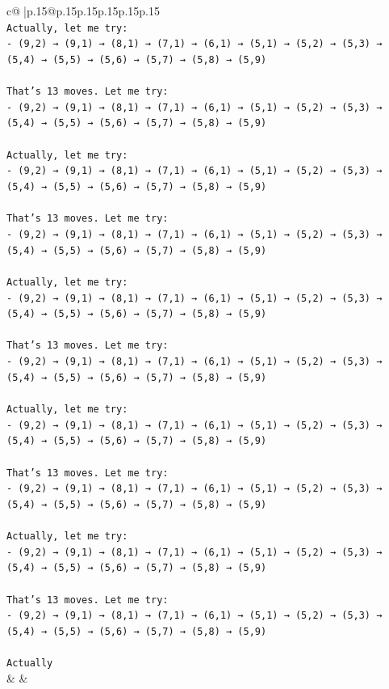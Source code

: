 \documentclass{article}
\begin{document}
{\begin{supertabular}{c@{$\;$}|p{.15\linewidth}@{}p{.15\linewidth}p{.15\linewidth}p{.15\linewidth}p{.15\linewidth}p{.15\linewidth}}
{{{\\ 
\texttt{Actually, let me try:} \\
\texttt{{-} (9,2) → (9,1) → (8,1) → (7,1) → (6,1) → (5,1) → (5,2) → (5,3) → (5,4) → (5,5) → (5,6) → (5,7) → (5,8) → (5,9)} \\
\\ 
\texttt{That's 13 moves. Let me try:} \\
\texttt{{-} (9,2) → (9,1) → (8,1) → (7,1) → (6,1) → (5,1) → (5,2) → (5,3) → (5,4) → (5,5) → (5,6) → (5,7) → (5,8) → (5,9)} \\
\\ 
\texttt{Actually, let me try:} \\
\texttt{{-} (9,2) → (9,1) → (8,1) → (7,1) → (6,1) → (5,1) → (5,2) → (5,3) → (5,4) → (5,5) → (5,6) → (5,7) → (5,8) → (5,9)} \\
\\ 
\texttt{That's 13 moves. Let me try:} \\
\texttt{{-} (9,2) → (9,1) → (8,1) → (7,1) → (6,1) → (5,1) → (5,2) → (5,3) → (5,4) → (5,5) → (5,6) → (5,7) → (5,8) → (5,9)} \\
\\ 
\texttt{Actually, let me try:} \\
\texttt{{-} (9,2) → (9,1) → (8,1) → (7,1) → (6,1) → (5,1) → (5,2) → (5,3) → (5,4) → (5,5) → (5,6) → (5,7) → (5,8) → (5,9)} \\
\\ 
\texttt{That's 13 moves. Let me try:} \\
\texttt{{-} (9,2) → (9,1) → (8,1) → (7,1) → (6,1) → (5,1) → (5,2) → (5,3) → (5,4) → (5,5) → (5,6) → (5,7) → (5,8) → (5,9)} \\
\\ 
\texttt{Actually, let me try:} \\
\texttt{{-} (9,2) → (9,1) → (8,1) → (7,1) → (6,1) → (5,1) → (5,2) → (5,3) → (5,4) → (5,5) → (5,6) → (5,7) → (5,8) → (5,9)} \\
\\ 
\texttt{That's 13 moves. Let me try:} \\
\texttt{{-} (9,2) → (9,1) → (8,1) → (7,1) → (6,1) → (5,1) → (5,2) → (5,3) → (5,4) → (5,5) → (5,6) → (5,7) → (5,8) → (5,9)} \\
\\ 
\texttt{Actually, let me try:} \\
\texttt{{-} (9,2) → (9,1) → (8,1) → (7,1) → (6,1) → (5,1) → (5,2) → (5,3) → (5,4) → (5,5) → (5,6) → (5,7) → (5,8) → (5,9)} \\
\\ 
\texttt{That's 13 moves. Let me try:} \\
\texttt{{-} (9,2) → (9,1) → (8,1) → (7,1) → (6,1) → (5,1) → (5,2) → (5,3) → (5,4) → (5,5) → (5,6) → (5,7) → (5,8) → (5,9)} \\
\\ 
\texttt{Actually} \\
            }
        }
    }
    & & \\ \\


\end{supertabular}}
\end{document}
